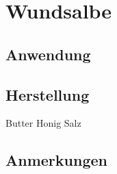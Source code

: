 \section{Wundsalbe}


 

\subsection{Anwendung}
\subsection{Herstellung}
Butter Honig Salz

\subsection{Anmerkungen}



